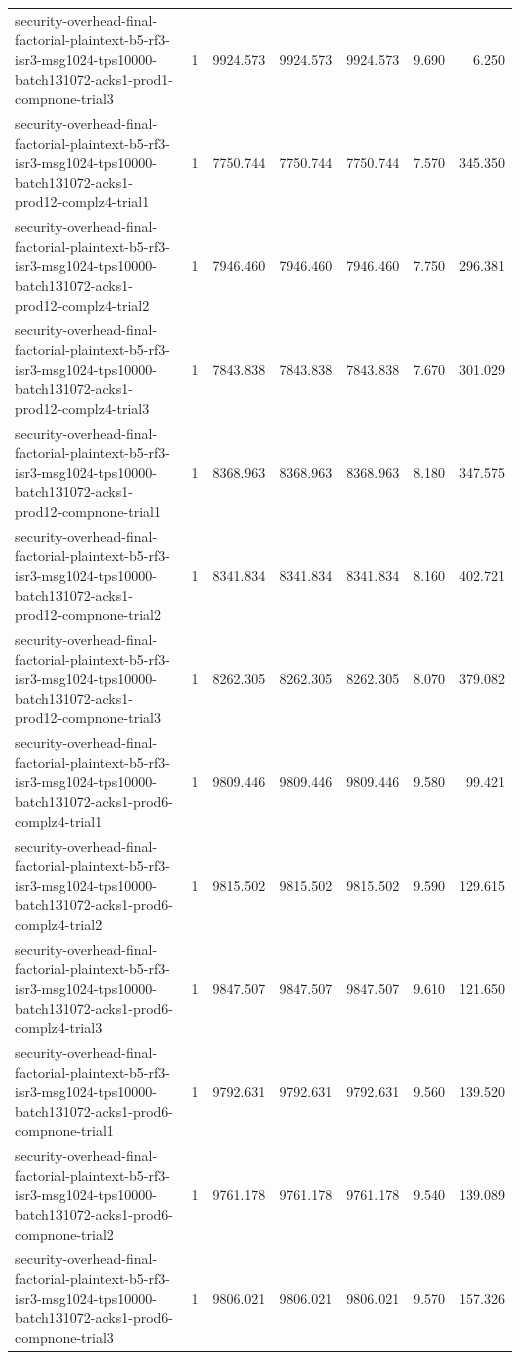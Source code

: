 \begin{tabular}{lrrrrrr}
security-overhead-final-factorial-plaintext-b5-rf3-isr3-msg1024-tps10000-batch131072-acks1-prod1-compnone-trial3 & 1 & 9924.573 & 9924.573 & 9924.573 & 9.690 & 6.250 \\
security-overhead-final-factorial-plaintext-b5-rf3-isr3-msg1024-tps10000-batch131072-acks1-prod12-complz4-trial1 & 1 & 7750.744 & 7750.744 & 7750.744 & 7.570 & 345.350 \\
security-overhead-final-factorial-plaintext-b5-rf3-isr3-msg1024-tps10000-batch131072-acks1-prod12-complz4-trial2 & 1 & 7946.460 & 7946.460 & 7946.460 & 7.750 & 296.381 \\
security-overhead-final-factorial-plaintext-b5-rf3-isr3-msg1024-tps10000-batch131072-acks1-prod12-complz4-trial3 & 1 & 7843.838 & 7843.838 & 7843.838 & 7.670 & 301.029 \\
security-overhead-final-factorial-plaintext-b5-rf3-isr3-msg1024-tps10000-batch131072-acks1-prod12-compnone-trial1 & 1 & 8368.963 & 8368.963 & 8368.963 & 8.180 & 347.575 \\
security-overhead-final-factorial-plaintext-b5-rf3-isr3-msg1024-tps10000-batch131072-acks1-prod12-compnone-trial2 & 1 & 8341.834 & 8341.834 & 8341.834 & 8.160 & 402.721 \\
security-overhead-final-factorial-plaintext-b5-rf3-isr3-msg1024-tps10000-batch131072-acks1-prod12-compnone-trial3 & 1 & 8262.305 & 8262.305 & 8262.305 & 8.070 & 379.082 \\
security-overhead-final-factorial-plaintext-b5-rf3-isr3-msg1024-tps10000-batch131072-acks1-prod6-complz4-trial1 & 1 & 9809.446 & 9809.446 & 9809.446 & 9.580 & 99.421 \\
security-overhead-final-factorial-plaintext-b5-rf3-isr3-msg1024-tps10000-batch131072-acks1-prod6-complz4-trial2 & 1 & 9815.502 & 9815.502 & 9815.502 & 9.590 & 129.615 \\
security-overhead-final-factorial-plaintext-b5-rf3-isr3-msg1024-tps10000-batch131072-acks1-prod6-complz4-trial3 & 1 & 9847.507 & 9847.507 & 9847.507 & 9.610 & 121.650 \\
security-overhead-final-factorial-plaintext-b5-rf3-isr3-msg1024-tps10000-batch131072-acks1-prod6-compnone-trial1 & 1 & 9792.631 & 9792.631 & 9792.631 & 9.560 & 139.520 \\
security-overhead-final-factorial-plaintext-b5-rf3-isr3-msg1024-tps10000-batch131072-acks1-prod6-compnone-trial2 & 1 & 9761.178 & 9761.178 & 9761.178 & 9.540 & 139.089 \\
security-overhead-final-factorial-plaintext-b5-rf3-isr3-msg1024-tps10000-batch131072-acks1-prod6-compnone-trial3 & 1 & 9806.021 & 9806.021 & 9806.021 & 9.570 & 157.326 \\

\end{tabular}
